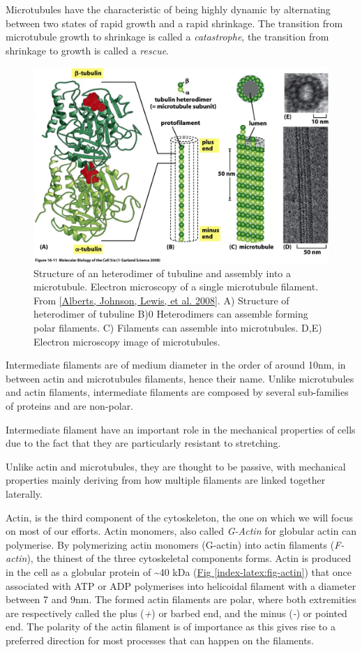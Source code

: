 \documentclass[A4paperpaper,11pt,english]{sphinxmanual}
\begin{document}
Microtubules have the characteristic of being highly dynamic by alternating
between two states of rapid growth and a rapid shrinkage. The transition from
microtubule growth to shrinkage is called a \emph{catastrophe}, the transition from
shrinkage to growth is called a \emph{rescue}.
\begin{figure}[htbp]
\centering
\capstart

\includegraphics[width=0.700\linewidth]{microtubules-structure.jpg}
\caption{Structure of an heterodimer of tubuline and assembly into a microtubule.
Electron microscopy of a single microtubule filament. From {\hyperref[index-latex:alberts2008]{{[}Alberts, Johnson, Lewis,  et al.  2008{]}}}.
A) Structure of heterodimer of tubuline B)0
Heterodimers can assemble forming polar filaments. C) Filaments can
assemble into  microtubules. D,E) Electron microscopy image of
microtubules.}\label{index-latex:fig-mt}\end{figure}

Intermediate filaments are of medium diameter in the order of around 10nm, in
between actin and microtubules filaments, hence their name.  Unlike microtubules
and actin filaments, intermediate filaments are composed by several sub-families
of proteins and are non-polar.

Intermediate filament have an important role in the mechanical properties of
cells due to the fact that they are particularly  resistant to stretching.

Unlike actin and microtubules, they are thought to be passive, with mechanical
properties mainly deriving from how multiple filaments are linked together
laterally.

Actin, is the third component of the cytoskeleton, the one on which  we will
focus on most of our efforts. Actin monomers, also called \emph{G-Actin} for globular actin can polymerise.
By polymerizing actin monomers (G-actin) into actin filaments (\emph{F-actin}), the
thinest of the three cytoskeletal components forms. Actin is produced in the
cell as a globular protein of \textasciitilde{}40 kDa (\hyperref[index-latex:fig-actin]{Fig  \ref*{index-latex:fig-actin}}) that once associated with ATP or ADP
polymerises into helicoidal filament with a diameter between 7 and 9nm. The
formed actin filaments are polar, where both extremities are respectively called the
plus (\emph{+}) or barbed end, and the minus (\emph{-}) or pointed end. The polarity of
the actin filament is of importance as this gives rise to a preferred direction
for most processes that can happen on the filaments.
\end{document}
